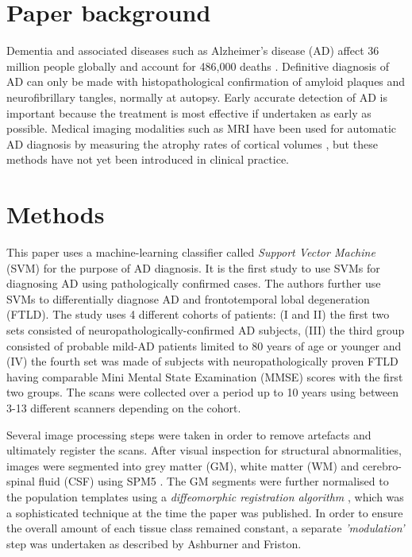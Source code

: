 \documentclass[11pt,a4paper,oneside]{report}
\begin{document}
\section*{Paper background}

Dementia and associated diseases such as Alzheimer's disease (AD) affect 36 million people globally \cite{world2012dementia} and account for 486,000 deaths \cite{lozano2013global}. Definitive diagnosis of AD can only be made with histopathological confirmation of amyloid plaques and neurofibrillary tangles, normally at autopsy. Early accurate detection of AD is important because the treatment is most effective if undertaken as early as possible. Medical imaging modalities such as MRI have been used for automatic AD diagnosis by measuring the atrophy rates of cortical volumes \cite{fox2004imaging,barnes2004differentiating,wahlund2005evidence}, but these methods have not yet been introduced in clinical practice.

\section*{Methods}

This paper uses a machine-learning classifier called \emph{Support Vector Machine} (SVM) for the purpose of AD diagnosis. \cite{kloppel2008automatic} It is the first study to use SVMs for diagnosing AD using pathologically confirmed cases. The authors further use SVMs to differentially diagnose AD and frontotemporal lobal degeneration (FTLD). The study uses 4 different cohorts of patients: (I and II) the first two sets consisted of neuropathologically-confirmed AD subjects, (III) the third group consisted of probable mild-AD patients limited to 80 years of age or younger and (IV) the fourth set was made of subjects with neuropathologically proven FTLD having comparable Mini Mental State Examination (MMSE) scores with the first two groups. The scans were collected over a period up to 10 years using between 3-13 different scanners depending on the cohort.

Several image processing steps were taken in order to remove artefacts and ultimately register the scans. After visual inspection for structural abnormalities, images were segmented into grey matter (GM), white matter (WM) and cerebro-spinal fluid (CSF) using SPM5 \cite{SPM5}. The GM segments were further normalised to the population templates using a \emph{diffeomorphic registration algorithm} \cite{ashburner2007fast}, which was a sophisticated technique at the time the paper was published. In order to ensure the overall amount of each tissue class remained constant, a separate \emph{'modulation'} step was undertaken as described by Ashburner and Friston. \cite{ashburner2000voxel}
\end{document}
